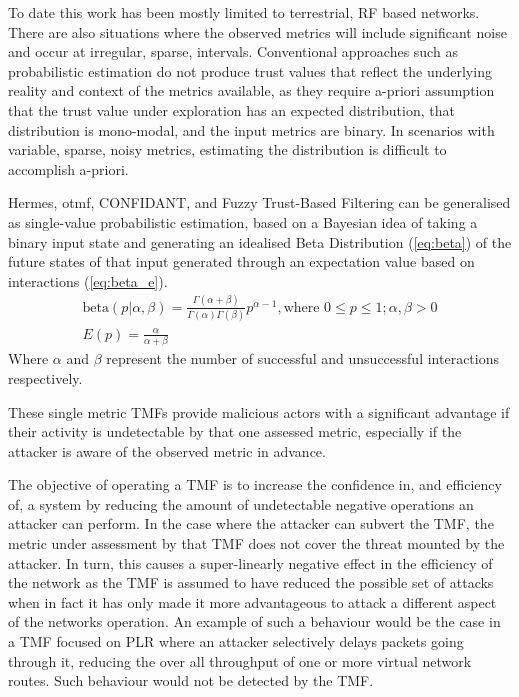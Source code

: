 To date this work has been mostly limited to terrestrial, RF based networks.
There are also situations where the observed metrics will include significant noise and occur at irregular, sparse, intervals.
Conventional approaches such as probabilistic estimation do not produce trust values that reflect the underlying reality and context of the metrics available, as they require a-priori assumption that the trust value under exploration has an expected distribution, that distribution is mono-modal, and the input metrics are binary.
In scenarios with variable, sparse, noisy metrics, estimating the distribution is difficult to accomplish a-priori.

Hermes, \acrshort{otmf}, CONFIDANT, and Fuzzy Trust-Based Filtering can be generalised as single-value probabilistic estimation, based on a Bayesian idea of taking a binary input state and generating an idealised Beta Distribution (\ref{eq:beta}) of the future states of that input generated through an expectation value based on interactions (\ref{eq:beta_e}).
\begin{align}
  \label{eq:beta}
  \text{beta}(p|\alpha,\beta) = \frac{\Gamma(\alpha + \beta)}{\Gamma(\alpha)\Gamma(\beta)}p^{\alpha-1},\text{where } 0 \leq p \leq 1; \alpha,\beta > 0\\
  \label{eq:beta_e}
  E(p) = \frac{\alpha}{\alpha + \beta}
\end{align}
Where $\alpha$ and $\beta$ represent the number of successful and unsuccessful interactions respectively.

These single metric TMFs provide malicious actors with a significant advantage if their activity is undetectable by that one assessed metric, especially if the attacker is aware of the observed metric in advance.

The objective of operating a TMF is to increase the confidence in, and efficiency of, a system by reducing the amount of undetectable negative operations an attacker can perform.
In the case where the attacker can subvert the TMF, the metric under assessment by that TMF does not cover the threat mounted by the attacker.
In turn, this causes a super-linearly negative effect in the efficiency of the network as the TMF is assumed to have reduced the possible set of attacks when in fact it has only made it more advantageous to attack a different aspect of the networks operation.
An example of such a behaviour would be the case in a TMF focused on PLR where an attacker selectively delays packets going through it, reducing the over all throughput of one or more virtual network routes.
Such behaviour would not be detected by the TMF.

